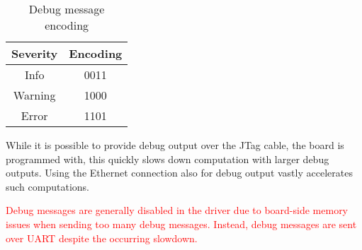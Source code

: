 \documentclass{report}
\begin{document}
\begin{table}[h]
\centering
\begin{tabular}{ c | c } 
Severity & Encoding \\ \hline
Info & 0011 \\
Warning & 1000 \\
Error &  1101 \\
 \end{tabular}
\caption{Debug message encoding}
\label{tab:protoDebug}
\end{table}

While it is possible to provide debug output over the JTag cable, the board is programmed with, this quickly slows down computation with larger debug outputs. Using the Ethernet connection also for debug output vastly accelerates such computations.

\textcolor{red}{Debug messages are generally disabled in the driver due to board-side memory issues when sending too many debug messages. Instead, debug messages are sent over UART despite the occurring slowdown.}
\end{document}
